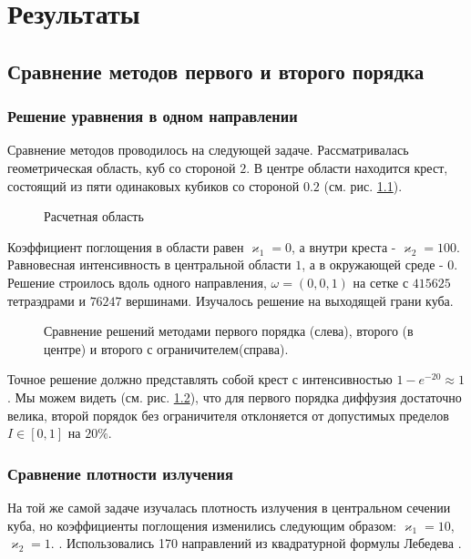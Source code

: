 \chapter{Результаты}

\section{Сравнение методов первого и второго порядка}
\subsection{Решение уравнения в одном направлении}
Сравнение методов проводилось на следующей задаче. Рассматривалась геометрическая область, куб со стороной $2$. В центре области находится крест, состоящий из пяти одинаковых кубиков со стороной $0.2$ (см. рис. \ref{fig:6}).
\begin{figure}[ht!]
\caption{Расчетная область}
\label{fig:6}
\end{figure}
Коэффициент поглощения в области равен $\varkappa_1=0$, а внутри креста - $\varkappa_2 = 100$. Равновесная интенсивность в центральной области $1$, а в окружающей среде - $0$. Решение строилось вдоль одного направления, $\omega = (0,0,1)$ на сетке с $415625$ тетраэдрами и $76247$ вершинами. Изучалось решение на выходящей грани куба. 
\begin{figure}[ht!]
\caption{Сравнение решений методами первого порядка (слева), второго (в центре) и второго с ограничителем(справа).}
\label{fig:7}
\end{figure}

Точное решение должно представлять собой крест с интенсивностью $1-e^{-20} \approx 1$. Мы можем видеть (см. рис. \ref{fig:7}), что для первого порядка диффузия достаточно велика, второй порядок без ограничителя отклоняется от допустимых пределов $I \in [0, 1]$ на $20 \%$. 
\subsection{Сравнение плотности излучения}
На той же самой задаче изучалась плотность излучения в центральном сечении куба, но коэффициенты поглощения изменились следующим образом: $\varkappa_1 = 10$, $\varkappa_2 = 1$. . Использовались 170 направлений из квадратурной формулы Лебедева \cite{lebedev_1999}. 


